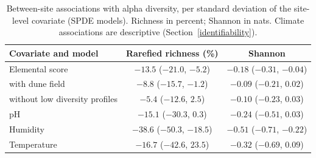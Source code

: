 \documentclass[11pt]{article}
\begin{document}
\begin{table}[htbp]\centering\small
\caption{Between-site associations with alpha diversity, per standard deviation of the site-level covariate (SPDE models). Richness in percent; Shannon in nats. Climate associations are descriptive (Section~\ref{identifiability}).}\label{tab:between_site}
\begin{tabular}{lcc}\toprule
Covariate and model & Rarefied richness (\%) & Shannon \\\midrule
Elemental score & $-13.5$ ($-21.0$, $-5.2$) & $-0.18$ ($-0.31$, $-0.04$) \\
\quad with dune field & $-8.8$ ($-15.7$, $-1.2$) & $-0.09$ ($-0.21$, $0.02$) \\
\quad without low diversity profiles & $-5.4$ ($-12.6$, $2.5$) & $-0.10$ ($-0.23$, $0.03$) \\
pH & $-15.1$ ($-30.3$, $0.3$) & $-0.24$ ($-0.51$, $0.03$) \\
Humidity & $-38.6$ ($-50.3$, $-18.5$) & $-0.51$ ($-0.71$, $-0.22$) \\
Temperature & $-16.7$ ($-42.6$, $23.5$) & $-0.32$ ($-0.69$, $0.09$) \\\bottomrule
\end{tabular}\end{table}

\begin{table}[htbp]\centering\small
\caption{Differences in alpha diversity between compartments within sites, estimated from spatial (SPDE) models. Richness differences are percentages; Shannon (nats) and normalized Shannon differences are absolute. Posterior medians with $95\,\%$ credible intervals.}\label{tab:compartment_alpha}
\end{table}

%
\end{document}
